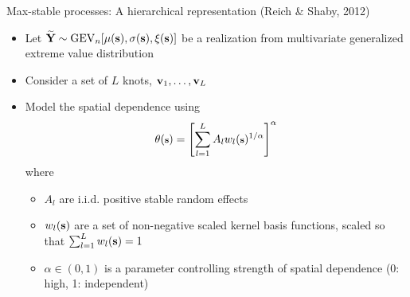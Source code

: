 \documentclass{beamer}
\begin{document}

\begin{frame}{Max-stable processes: A hierarchical representation (Reich \& Shaby, 2012)}
\begin{itemize} \setlength{\itemsep}{1em}
  \item Let $\widetilde{\mbox{\bf Y}} \sim \text{GEV}_n[\mu(\mbox{\bf s}), \sigma(\mbox{\bf s}), \xi(\mbox{\bf s})]$ be a realization from multivariate generalized extreme value distribution
  \item Consider a set of $L$ knots, $\mbox{\bf v}_1, \ldots, \mbox{\bf v}_L$
  \item Model the spatial dependence using
  \begin{align*}
    \footnotesize
    \theta(\mbox{\bf s}) = \left[\sum_{l = 1}^L A_l w_l(\mbox{\bf s})^{1 / \alpha}\right]^\alpha
  \end{align*}
  where
  \begin{itemize} \setlength{\itemsep}{0.5em}
    \item $A_l$ are i.i.d. positive stable random effects
    \item $w_l(\mbox{\bf s})$ are a set of non-negative scaled kernel basis functions, scaled so that $\sum_{l = 1}^L w_l(\mbox{\bf s}) = 1$
    \item $\alpha \in (0, 1)$ is a parameter controlling strength of spatial dependence (0: high, 1: independent)
  \end{itemize}
\end{itemize}
\end{frame}
\end{document}

